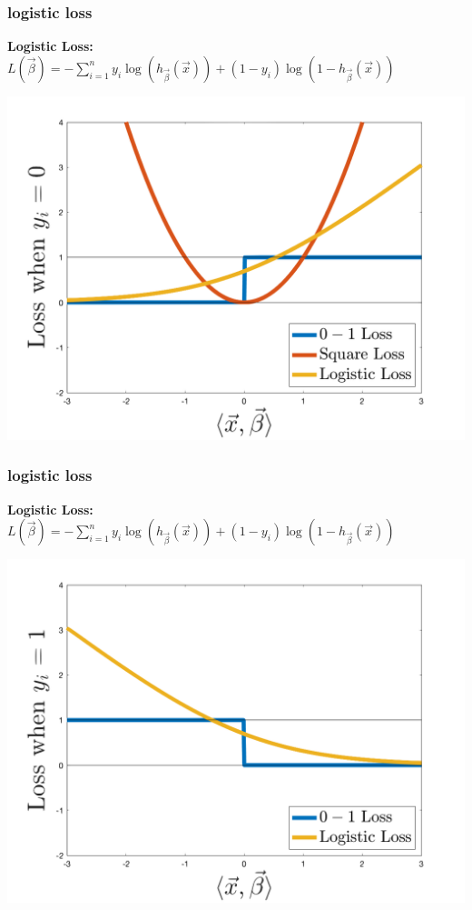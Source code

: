 \documentclass[handout,compress]{beamer}
\begin{document}
\begin{frame}
	\frametitle{logistic loss}
	\textbf{Logistic Loss:} $L(\vec{\beta}) = - \sum_{i=1}^n y_i \log(h_{\vec{\beta}}(\vec{x})) + (1-y_i) \log(1 - h_{\vec{\beta}}(\vec{x})) $
	\vspace{-.5em}
	\begin{center}
		\includegraphics[width=.6\textwidth]{all_loss.png}
	\end{center}
\end{frame}

\begin{frame}
	\frametitle{logistic loss}
	\textbf{Logistic Loss:} $L(\vec{\beta}) = - \sum_{i=1}^n y_i \log(h_{\vec{\beta}}(\vec{x})) + (1-y_i) \log(1 - h_{\vec{\beta}}(\vec{x})) $
	\vspace{-.5em}
	\begin{center}
		\includegraphics[width=.6\textwidth]{log_loss_flip.png}
	\end{center}
\end{frame}
\end{document}
